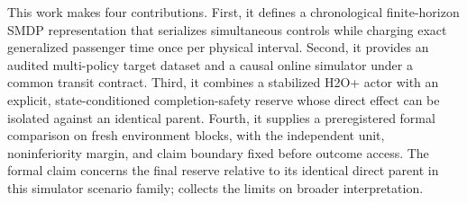 This work makes four contributions. First, it defines a chronological
finite-horizon SMDP representation that serializes simultaneous
controls while charging exact generalized passenger time once per physical
interval. Second, it provides an audited multi-policy target dataset and a
causal online simulator under a common transit contract. Third, it combines a
stabilized H2O+ actor with an explicit, state-conditioned completion-safety
reserve whose direct effect can be isolated against an identical parent.
Fourth, it supplies a preregistered formal comparison on fresh environment
blocks, with the independent unit, noninferiority margin, and claim boundary
fixed before outcome access. The formal claim concerns the final reserve
relative to its identical direct parent in this simulator scenario family;
 collects the limits on broader interpretation.
